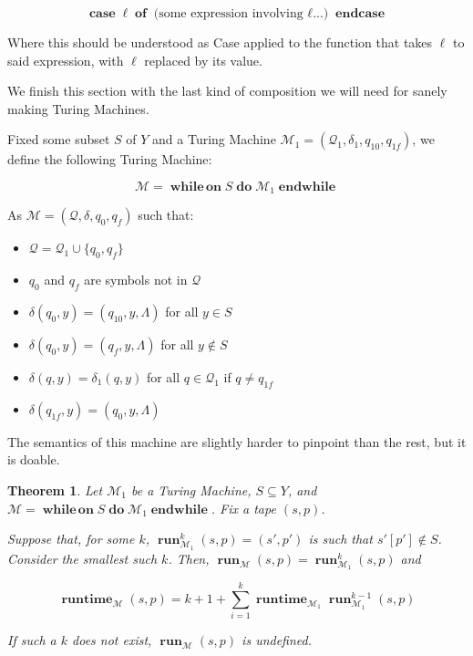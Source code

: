 \documentclass{article}
\newtheorem{theorem}{Theorem}
\newcommand{\M}{\mathcal{M}}
\newcommand{\Q}{\mathcal{Q}}
\DeclareMathOperator{\run}{\mathbf{run}}
\DeclareMathOperator{\runtime}{\mathbf{runtime}}
\DeclareMathOperator{\Nwhileon}{\mathbf{while\,on}}
\DeclareMathOperator{\Ndo}{\mathbf{do}}
\DeclareMathOperator{\Nendwhile}{\mathbf{endwhile}}
\DeclareMathOperator{\Ncase}{\mathbf{case}}
\DeclareMathOperator{\Nof}{\mathbf{of}}
\DeclareMathOperator{\Nendcase}{\mathbf{endcase}}
\begin{document}
	\[\Ncase \ell \Nof \text{(some expression involving $\ell$...)} \Nendcase\]
	
	Where this should be understood as Case applied to the function that takes $\ell$ to said expression, with $\ell$ replaced by its value.
	
	We finish this section with the last kind of composition we will need for sanely making Turing Machines.

	Fixed some subset $S$ of $Y$ and a Turing Machine $\M_1 = (\Q_1, \delta_1, q_{10}, q_{1f})$, we define the following Turing Machine:
	
	\[ \M = \Nwhileon S \Ndo \M_1 \Nendwhile \]
	
	As $\M = (\Q, \delta, q_0, q_f)$ such that:
	
	\begin{itemize}
	\item $\Q = \Q_1 \cup \{q_0, q_f\}$
	
	\item $q_0$ and $q_f$ are symbols not in $\Q$
	
	\item $\delta(q_0, y) = (q_{10}, y, \Lambda)$ for all $y \in S$
	
	\item $\delta(q_0, y) = (q_f, y, \Lambda)$ for all $y \not\in S$
	
	\item $\delta(q, y) = \delta_1(q, y)$ for all $q \in \Q_1$ if $q \neq q_{1f}$
	
	\item $\delta(q_{1f}, y) = (q_0, y, \Lambda)$
	\end{itemize}
	
	The semantics of this machine are slightly harder to pinpoint than the rest, but it is doable.
	
	\begin{theorem}
	Let $\M_1$ be a Turing Machine, $S \subseteq Y$, and $\M = \Nwhileon S \Ndo \M_1 \Nendwhile$. Fix a tape $(s,p)$.

	Suppose that, for some $k$, $\run_{\M_1}^k (s,p) = (s', p')$ is such that $s'[p'] \not \in S$. Consider the smallest such $k$. Then, $\run_\M (s,p) = \run_{\M_1}^k (s,p)$ and 
	
	\[\runtime_\M (s,p) = k + 1 + \sum_{i=1}^k \runtime_{\M_1} \run_{\M_1}^{k-1}(s,p)\]
	
	If such a $k$ does not exist, $\run_\M(s,p)$ is undefined.
	\end{theorem}
	
\end{document}
